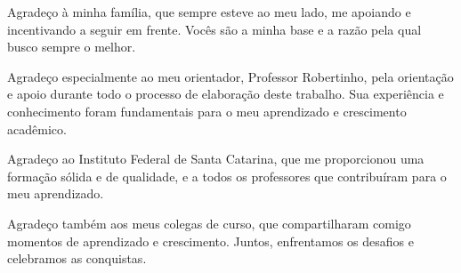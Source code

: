 \begin{agradecimentos}
    
    Agradeço à minha família, que sempre esteve ao meu lado, me apoiando e incentivando a seguir em frente. Vocês são a minha base e a razão pela qual busco sempre o melhor.
    
    Agradeço especialmente ao meu orientador, Professor Robertinho, pela orientação e apoio durante todo o processo de elaboração deste trabalho. Sua experiência e conhecimento foram fundamentais para o meu aprendizado e crescimento acadêmico.
    
    Agradeço ao Instituto Federal de Santa Catarina, que me proporcionou uma formação sólida e de qualidade, e a todos os professores que contribuíram para o meu aprendizado.
    
    Agradeço também aos meus colegas de curso, que compartilharam comigo momentos de aprendizado e crescimento. Juntos, enfrentamos os desafios e celebramos as conquistas.
    
\end{agradecimentos}